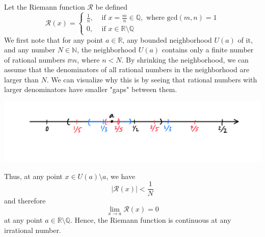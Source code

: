   \begin{example}
    Let the Riemann function $\mathcal{R}$ be defined
    \[\mathcal{R}(x) = \begin{cases}
    \frac{1}{n}, & \text{ if } x = \frac{m}{n} \in \mathbb{Q}, \text{ where gcd}(m, n) = 1 \\
    0, & \text{ if } x \in \mathbb{R} \setminus \mathbb{Q}
    \end{cases}\]
    We first note that for any point $a \in \mathbb{R}$, any bounded neighborhood $U(a)$ of it, and any number $N \in \mathbb{N}$, the neighborhood $U(a)$ contains only a finite number of rational numbers $\mathbb{m}{n}$, where $n < N$. By shrinking the neighborhood, we can assume that the denominators of all rational numbers in the neighborhood are larger than $N$. We can visualize why this is by seeing that rational numbers with larger denominators have smaller "gaps" between them. 
    \begin{center}
        \includegraphics[scale=0.23]{img/Rationals_Spread_Apart.PNG}
    \end{center}
    Thus, at any point $x \in U(a) \setminus a$, we have 
    \[\big| \mathcal{R}(x) \big| < \frac{1}{N}\]
    and therefore
    \[\lim_{x \rightarrow a} \mathcal{R} (x) = 0\]
    at any point $a \in \mathbb{R} \setminus \mathbb{Q}$. Hence, the Riemann function is continuous at any irrational number. 
  \end{example}


